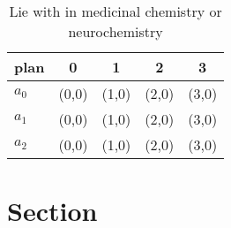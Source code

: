 \documentclass[a4paper]{article}
\begin{document}
\begin{table}
\begin{adjustbox}{width=0.6\columnwidth}
\begin{tabular}{|l|l|l|l|l|}
\hline
\textbf{plan} & \multicolumn{1}{c|}{\textbf{0}} & \multicolumn{1}{c|}{\textbf{1}} & \multicolumn{1}{c|}{\textbf{2}} & \multicolumn{1}{c|}{\textbf{3}} \\ \hline
\textbf{$a_0$}  & (0,0) & (1,0) & (2,0) & (3,0) \\ \hline
\textbf{$a_1$}  & (0,0) & (1,0) & (2,0) & (3,0) \\ \hline
\textbf{$a_2$}  & (0,0) & (1,0) & (2,0) & (3,0) \\ \hline
\end{tabular}
\end{adjustbox}
\caption{Lie with in medicinal chemistry or neurochemistry
}
\end{table}

\section{Section}
\end{document}
